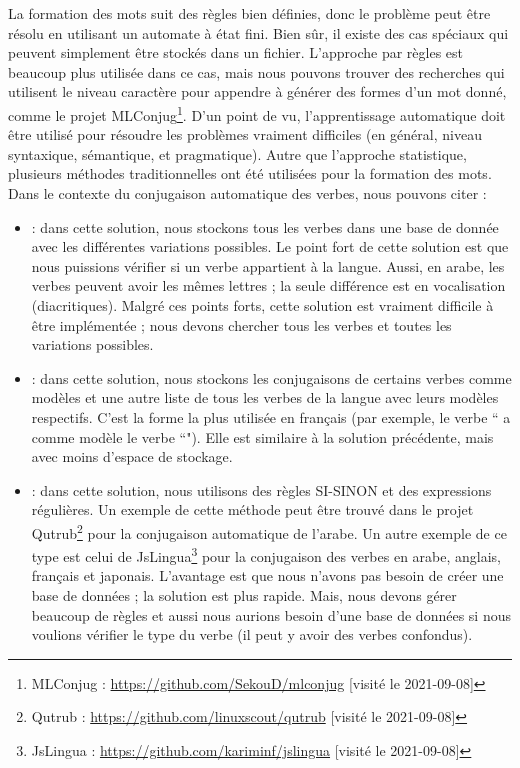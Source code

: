 \documentclass{KodeBook}
\begin{document}
La formation des mots suit des règles bien définies, donc le problème peut être résolu en utilisant un automate à état fini. 
Bien sûr, il existe des cas spéciaux qui peuvent simplement être stockés dans un fichier. 
L'approche par règles est beaucoup plus utilisée dans ce cas, mais nous pouvons trouver des recherches qui utilisent le niveau caractère pour appendre à générer des formes d'un mot donné, comme le projet MLConjug\footnote{MLConjug : \url{https://github.com/SekouD/mlconjug} [visité le 2021-09-08]}. 
D'un point de vu, l'apprentissage automatique doit être utilisé pour résoudre les problèmes vraiment difficiles (en général, niveau syntaxique, sémantique, et pragmatique). 
Autre que l'approche statistique, plusieurs méthodes traditionnelles ont été utilisées pour la formation des mots. 
Dans le contexte du conjugaison automatique des verbes, nous pouvons citer :
\begin{itemize}
	\item {} : dans cette solution, nous stockons tous les verbes dans une base de donnée avec les différentes variations possibles. 
	Le point fort de cette solution est que nous puissions vérifier si un verbe appartient à la langue. 
	Aussi, en arabe, les verbes peuvent avoir les mêmes lettres ; la seule différence est en vocalisation (diacritiques).
	Malgré ces points forts, cette solution est vraiment difficile à être implémentée ; nous devons chercher tous les verbes et toutes les variations possibles. 
	
	\item {} : dans cette solution, nous stockons les conjugaisons de certains verbes comme modèles et une autre liste de tous les verbes de la langue avec leurs modèles respectifs.
	C'est la forme la plus utilisée en français (par exemple, le verbe `` a comme modèle le verbe ``"). 
	Elle est similaire à la solution précédente, mais avec moins d'espace de stockage.
	
	\item {} : dans cette solution, nous utilisons des règles SI-SINON et des expressions régulières.
	Un exemple de cette méthode peut être trouvé dans le projet Qutrub\footnote{Qutrub : \url{https://github.com/linuxscout/qutrub} [visité le 2021-09-08]} pour la conjugaison automatique de l'arabe.  
	Un autre exemple de ce type est celui de JsLingua\footnote{JsLingua : \url{https://github.com/kariminf/jslingua} [visité le 2021-09-08]} pour la conjugaison des verbes en arabe, anglais, français et japonais. 
	L'avantage est que nous n'avons pas besoin de créer une base de données ; la solution est plus rapide. 
	Mais, nous devons gérer beaucoup de règles et aussi nous aurions besoin d'une base de données si nous voulions vérifier le type du verbe (il peut y avoir des verbes confondus).

\end{itemize}
\end{document}
